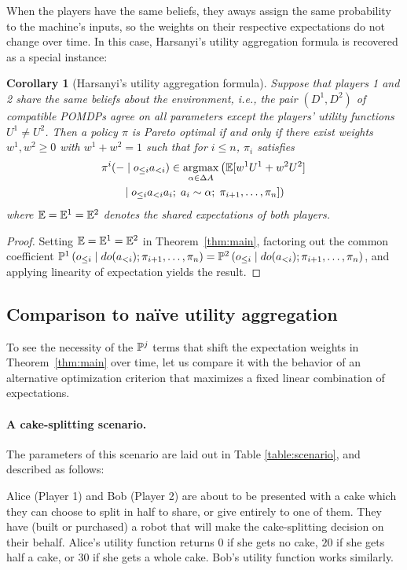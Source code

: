 \documentclass{article}
\newcommand{\hist}[1]{o_{\le #1}a_{<#1}}
\newcommand{\dohist}[1]{o_{\le #1} \mid do(a_{<#1})}
\newcommand{\thm}[1]{Theorem~\ref{thm:#1}}
\DeclareMathOperator*{\argmax}{argmax}
\newtheorem{corollary}[theorem]{Corollary}
\begin{document}
When the players have the same beliefs, they aways assign the same probability to the machine's inputs, so the weights on their respective expectations do not change over time.  In this case, Harsanyi's utility aggregation formula is recovered as a special instance:

\begin{corollary}[Harsanyi's utility aggregation formula]\label{cor:harsanyi}
Suppose that players 1 and 2 share the same beliefs about the environment, i.e., the pair $(D^1,D^2)$ of compatible POMDPs agree on all parameters except the players' utility functions $U^1\neq U^2$. Then a policy $\pi$ is Pareto optimal if and only if there exist weights $w^1,w^2\geq 0$ with $w^1+w^2=1$ such that for $i\le n$, $\pi_i$ satisfies
\begin{multline*}
\pi^i(-\mid\hist{i}) \in \argmax_{\alpha\in\Delta A} \left(\EE[w^1U^1+w^2U^2]\right. \\
\left. \mid \hist{i} a_i ;\; a_i\sim \alpha;\; \pi_{i+1},\ldots,\pi_n]\right)
\end{multline*}
where $\mathbb{E}=\mathbb{E}^1=\mathbb{E}^2$ denotes the shared expectations of both players.
\end{corollary}
\begin{proof}
Setting $\mathbb{E}=\mathbb{E}^1=\mathbb{E}^2$ in \thm{main}, factoring out the common coefficient $\PP^1\left(\dohist{i}; \pi_{i+1},\ldots,\pi_n\right)=\PP^2\left(\dohist{i}; \pi_{i+1},\ldots,\pi_n\right)$, and applying linearity of expectation yields the result.
\end{proof}

\subsection{Comparison to na\"{i}ve utility aggregation}\label{sec:comparison}

To see the necessity of the $\mathbb{P}^j$ terms that shift the expectation weights in \thm{main} over time, let us compare it with the behavior of an alternative optimization criterion that maximizes a fixed linear combination of expectations.

\paragraph{A cake-splitting scenario.}  The parameters of this scenario are laid out in Table \ref{table:scenario}, and described as follows:

Alice (Player 1) and Bob (Player 2) are about to be presented with a cake which they can choose to split in half to share, or give entirely to one of them.  They have (built or purchased) a robot that will make the cake-splitting decision on their behalf.  Alice's utility function returns $0$ if she gets no cake, $20$ if she gets half a cake, or $30$ if she gets a whole cake.  Bob's utility function works similarly.
\end{document}

